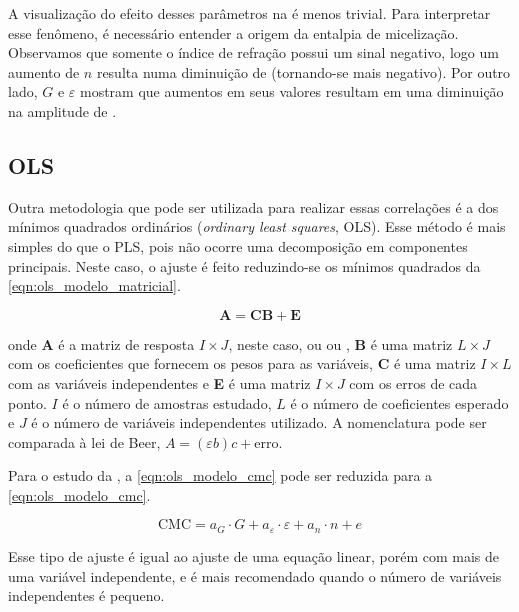 		A visualização do efeito desses parâmetros na \DHmic{} é menos trivial. Para interpretar esse fenômeno, é necessário entender a origem da entalpia de micelização. %
		Observamos que somente o índice de refração possui um sinal negativo, logo um aumento de \(n\) resulta numa diminuição de \DHmic{} (tornando-se mais negativo). Por outro lado, \(G\) e \(\varepsilon\) mostram que aumentos em seus valores resultam em uma diminuição na amplitude de \DHmic. 
		
		\FloatBarrier
		\subsection{OLS}
		
		Outra metodologia que pode ser utilizada para realizar essas correlações é a dos mínimos quadrados ordinários (\emph{ordinary least squares}, OLS). Esse método é mais simples do que o PLS, pois não ocorre uma decomposição em componentes principais. Neste caso, o ajuste é feito reduzindo-se os mínimos quadrados da \autoref{eqn:ols_modelo_matricial}.
	
		\begin{equation}
			\mathbf{A} = \mathbf{CB} + \mathbf{E}
			\label{eqn:ols_modelo_matricial}
		\end{equation}
		
		\noindent onde \textbf{A} é a matriz de resposta \(I \times J\), neste caso, ou \cmc{} ou \DHmic, \textbf{B} é uma matriz \(L \times J\) com os coeficientes que fornecem os pesos para as variáveis, \textbf{C} é uma matriz \(I \times L\) com as variáveis independentes e \textbf{E} é uma matriz \(I \times J\) com os erros de cada ponto. \(I\) é o número de amostras estudado, \(L\) é o número de coeficientes esperado e \(J\) é o número de variáveis independentes utilizado. A nomenclatura pode ser comparada à lei de Beer, \(A = (\varepsilon b)c + \mathrm{erro}\).
		
		Para o estudo da \cmc, a \autoref{eqn:ols_modelo_cmc} pode ser reduzida para a \autoref{eqn:ols_modelo_cmc}.
		
		\begin{equation}
		\textrm{CMC} = a_G \cdot G + a_\varepsilon \cdot \varepsilon + a_n \cdot n + e
		\label{eqn:ols_modelo_cmc}
		\end{equation}
		
		Esse tipo de ajuste é igual ao ajuste de uma equação linear, porém com mais de uma variável independente, e é mais recomendado quando o número de variáveis independentes é pequeno.
		
